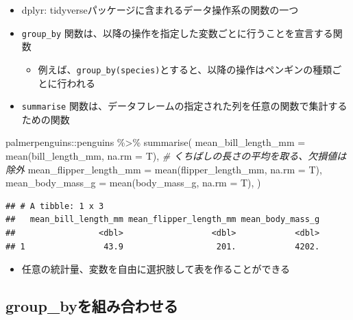 \documentclass[
]{ltjsarticle}
\newenvironment{Shaded}{\begin{snugshade}}{\end{snugshade}}
\newcommand{\AttributeTok}[1]{\textcolor[rgb]{0.77,0.63,0.00}{#1}}
\newcommand{\CommentTok}[1]{\textcolor[rgb]{0.56,0.35,0.01}{\textit{#1}}}
\newcommand{\FunctionTok}[1]{\textcolor[rgb]{0.00,0.00,0.00}{#1}}
\newcommand{\NormalTok}[1]{#1}
\newcommand{\SpecialCharTok}[1]{\textcolor[rgb]{0.00,0.00,0.00}{#1}}
\providecommand{\tightlist}{%
  \setlength{\itemsep}{0pt}\setlength{\parskip}{0pt}}
\begin{document}
\begin{itemize}
\tightlist
\item
  dplyr: tidyverseパッケージに含まれるデータ操作系の関数の一つ
\item
  \texttt{group\_by}
  関数は、以降の操作を指定した変数ごとに行うことを宣言する関数

  \begin{itemize}
  \tightlist
  \item
    例えば、\texttt{group\_by(species)}とすると、以降の操作はペンギンの種類ごとに行われる
  \end{itemize}
\item
  \texttt{summarise}
  関数は、データフレームの指定された列を任意の関数で集計するための関数
\end{itemize}

\begin{Shaded}
\begin{Highlighting}[]
\NormalTok{palmerpenguins}\SpecialCharTok{::}\NormalTok{penguins }\SpecialCharTok{\%\textgreater{}\%}
  \FunctionTok{summarise}\NormalTok{(}
    \AttributeTok{mean\_bill\_length\_mm =} \FunctionTok{mean}\NormalTok{(bill\_length\_mm, }\AttributeTok{na.rm =}\NormalTok{ T), }\CommentTok{\# くちばしの長さの平均を取る、欠損値は除外}
    \AttributeTok{mean\_flipper\_length\_mm =} \FunctionTok{mean}\NormalTok{(flipper\_length\_mm, }\AttributeTok{na.rm =}\NormalTok{ T),}
    \AttributeTok{mean\_body\_mass\_g =} \FunctionTok{mean}\NormalTok{(body\_mass\_g, }\AttributeTok{na.rm =}\NormalTok{ T),}
\NormalTok{  )}
\end{Highlighting}
\end{Shaded}

\begin{verbatim}
## # A tibble: 1 x 3
##   mean_bill_length_mm mean_flipper_length_mm mean_body_mass_g
##                 <dbl>                  <dbl>            <dbl>
## 1                43.9                   201.            4202.
\end{verbatim}

\begin{itemize}
\tightlist
\item
  任意の統計量、変数を自由に選択肢して表を作ることができる
\end{itemize}

\hypertarget{group_byux3092ux7d44ux307fux5408ux308fux305bux308b}{%
\subsection{group\_byを組み合わせる}\label{group_byux3092ux7d44ux307fux5408ux308fux305bux308b}}
\end{document}
